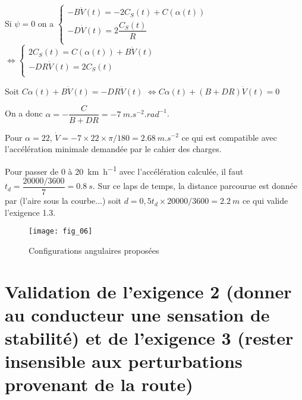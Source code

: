 \ifprof
\begin{corrige}
Si  $\psi=0$ on a 
$
\left\{
\begin{array}{l}
 - B \dot{V}(t) = - 2C_S(t)+C\left(\alpha(t) \right) \\
 - D \dot{V}(t) = 2\dfrac{C_S(t)}{R} \\\end{array}
\right.
$
$ \Leftrightarrow 
\left\{
\begin{array}{l}
   2C_S(t) = C\left(\alpha(t) \right) +B \dot{V}(t) \\
 - DR\dot{V}(t) = 2C_S(t) \\\end{array}
\right.
$

Soit $C\alpha(t)  +B \dot{V}(t)= - DR\dot{V}(t)$ 
$\Leftrightarrow C\alpha(t)  +\left(B + DR\right)\dot{V}(t)= 0$ 

On a donc $\alpha = - \dfrac{C}{B + DR} = -\SI{7}{m.s^{-2}.rad^{-1}}$.

\end{corrige}
\else
\fi

\ifprof
\begin{corrige}

Pour $\alpha = 22$, $\dot{V}=-7 \times 22 \times \pi /180 =\SI{2,68}{m.s^{-2}}$ ce qui est compatible avec l'accélération minimale demandée par le cahier des charges. 


Pour passer de 0 à \SI{20}{km.h^{-1}} avec l'accélération calculée, il faut $t_d = \dfrac{20 000/3600}{7}=\SI{0,8}{s}$. Sur ce laps de temps, la distance parcourue est donnée par (l'aire sous la courbe...) soit $d=0,5 t_d \times 20 000/3600 = \SI{2,2}{m}$ ce qui valide l'exigence 1.3.
\end{corrige}
\else
\fi

\ifprof
\else
\begin{figure}[H]
\centering
\texttt{[image: fig\_06]}
\caption{Configurations angulaires proposées \label{fig_06}}
\end{figure}
\fi

\section{Validation de  l'exigence 2 (donner au conducteur une sensation de stabilité) et de l'exigence 3 (rester insensible aux perturbations provenant de la route)}

